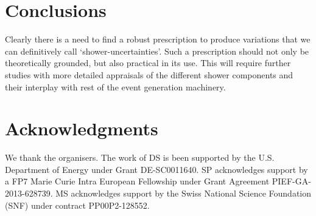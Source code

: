 \section{Conclusions}
\label{sec:psunc:conclusions}
Clearly there is a need to find a robust prescription to produce variations that we can definitively call `shower-uncertainties'. Such a prescription should not only be theoretically grounded, but also practical in its use. This will require further studies with more detailed appraisals of the different shower components and their interplay with rest of the event generation machinery. 

\section*{Acknowledgments}

We thank the organisers.
The work of DS is been supported by the U.S. Department of Energy under Grant
DE-SC0011640.
SP acknowledges support by a FP7 Marie Curie Intra European
Fellowship under Grant Agreement PIEF-GA-2013-628739. 
MS acknowledges support by the Swiss National Science Foundation (SNF) 
under contract PP00P2-128552.
